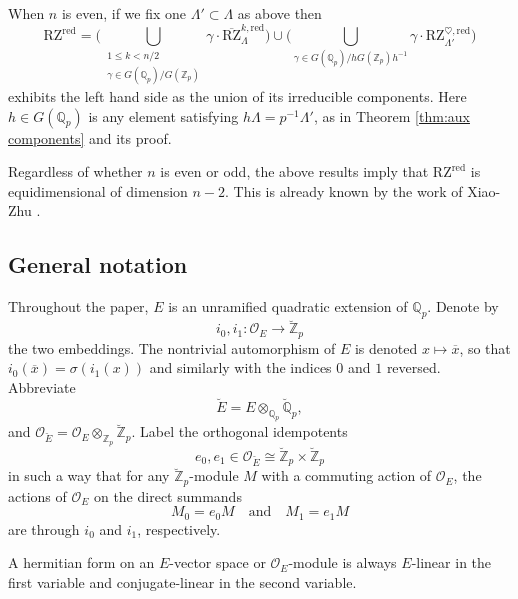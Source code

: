 \documentclass[11pt]{alggeom}
\newcommand{\iso}{\cong}
\newcommand{\red}{\mathrm{red}}
\newcommand{\Q}{\mathbb Q}
\newcommand{\Z}{\mathbb Z}
\newcommand{\co}{\mathcal O}
\begin{document}
When $n$ is even, if we fix one $\Lambda'\subset \Lambda$ as above then
\[
 \mathrm{RZ}^\red= 
\Big(   \bigcup_{ \substack{ 1\le k < n/2  \\  \gamma \in G(\Q_p)/G(\Z_p)} }   \gamma \cdot \overline{\mathrm{RZ}}_\Lambda^{k,\red}  \Big)
\cup 
\Big(  \bigcup_{  \gamma \in G(\Q_p)/ hG(\Z_p)h^{-1}   }   \gamma \cdot \mathrm{RZ}_{\Lambda'}^{\heartsuit,\red}  \Big)
 \]
 exhibits the left hand side as the union of its irreducible components. 
 Here $h\in G(\Q_p)$ is any element satisfying $h \Lambda = p^{-1} \Lambda'$, as in Theorem \ref{thm:aux components} and its proof.
 

Regardless of whether $n$ is even or odd, the above results imply that $\mathrm{RZ}^\red$ is equidimensional of dimension $n-2$.
This  is already known by the work of Xiao-Zhu \cite{XZ}.




\subsection{General notation}




 

Throughout the paper, $E$ is an unramified quadratic extension of $\Q_p$.
Denote by 
\[
i_0,i_1 : \co_E \to \breve{\Z}_p
\]
 the two embeddings.
The nontrivial automorphism of $E$ is denoted $x\mapsto \overline{x}$, so that $ i_0 ( \overline{x} ) = \sigma ( i_1(x))$ and similarly with the indices $0$ and $1$ reversed.
Abbreviate
\[
\breve{E} = E \otimes_{\Q_p}  \breve{\Q }_p,
 \] 
 and $\co_{\breve{E}} = \co_E \otimes_{\Z_p} \breve{\Z}_p$.
Label the orthogonal idempotents 
 \begin{equation}\label{orthopotents}
 e_0,e_1 \in \co_{\breve{E}} \iso \breve{\Z}_p \times \breve{\Z}_p
 \end{equation}
 in such a way that for any $\breve{\Z}_p$-module $M$ with a commuting action of $\co_E$, the actions of $\co_E$ on the direct summands
 \begin{equation}\label{general decomp}
 M_0 = e_0 M \quad \mbox{and}\quad M_1=e_1M 
 \end{equation}
 are through  $i_0$ and $i_1$, respectively.   





A hermitian form on an $E$-vector space or  $\co_E$-module is always $E$-linear in the first variable and conjugate-linear in the second variable.
\end{document}

